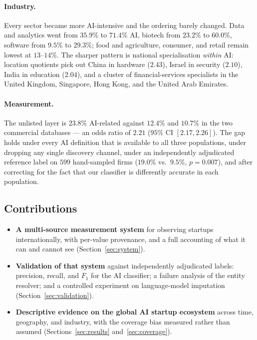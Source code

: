 \documentclass[11pt]{article}
\begin{document}
\paragraph{Industry.} Every sector became more AI-intensive and the ordering
barely changed. Data and analytics went from $35.9\%$ to $71.4\%$ AI, biotech
from $23.2\%$ to $60.0\%$, software from $9.5\%$ to $29.3\%$; food and
agriculture, consumer, and retail remain lowest at $13$--$14\%$. The sharper
pattern is national specialisation \emph{within} AI: location quotients pick
out China in hardware ($2.43$), Israel in security ($2.10$), India in education
($2.04$), and a cluster of financial-services specialists in the United
Kingdom, Singapore, Hong Kong, and the United Arab Emirates.

\paragraph{Measurement.} The unlisted layer is $23.8\%$ AI-related against
$12.4\%$ and $10.7\%$ in the two commercial databases --- an odds ratio of
$2.21$ ($95\%$ CI $[2.17, 2.26]$). The gap holds under every AI definition that
is available to all three populations, under dropping any single discovery
channel, under an independently adjudicated reference label on $599$
hand-sampled firms ($19.0\%$ vs.\ $9.5\%$, $p=0.007$), and after correcting for
the fact that our classifier is differently accurate in each population.

\subsection{Contributions}

\begin{itemize}[leftmargin=1.5em,itemsep=2pt]
\item \textbf{A multi-source measurement system} for observing startups
internationally, with per-value provenance, and a full accounting of what it
can and cannot see (Section~\ref{sec:system}).
\item \textbf{Validation of that system} against independently adjudicated
labels: precision, recall, and $F_1$ for the AI classifier; a failure analysis
of the entity resolver; and a controlled experiment on language-model
imputation (Section~\ref{sec:validation}).
\item \textbf{Descriptive evidence on the global AI startup ecosystem} across
time, geography, and industry, with the coverage bias measured rather than
assumed (Sections~\ref{sec:results} and~\ref{sec:coverage}).
\end{itemize}
\end{document}
